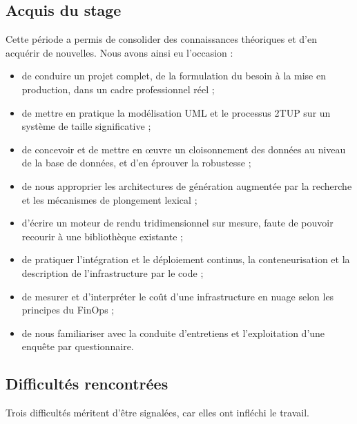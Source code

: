 \subsection{Acquis du stage}

Cette période a permis de consolider des connaissances théoriques et d'en
acquérir de nouvelles. Nous avons ainsi eu l'occasion :

\begin{itemize}
  \item de conduire un projet complet, de la formulation du besoin à la mise en
        production, dans un cadre professionnel réel ;
  \item de mettre en pratique la modélisation UML et le processus 2TUP sur un
        système de taille significative ;
  \item de concevoir et de mettre en œuvre un cloisonnement des données au
        niveau de la base de données, et d'en éprouver la robustesse ;
  \item de nous approprier les architectures de génération augmentée par la
        recherche et les mécanismes de plongement lexical ;
  \item d'écrire un moteur de rendu tridimensionnel sur mesure, faute de pouvoir
        recourir à une bibliothèque existante ;
  \item de pratiquer l'intégration et le déploiement continus, la
        conteneurisation et la description de l'infrastructure par le code ;
  \item de mesurer et d'interpréter le coût d'une infrastructure en nuage selon
        les principes du FinOps ;
  \item de nous familiariser avec la conduite d'entretiens et l'exploitation
        d'une enquête par questionnaire.
\end{itemize}

\subsection{Difficultés rencontrées}

Trois difficultés méritent d'être signalées, car elles ont infléchi le travail.


